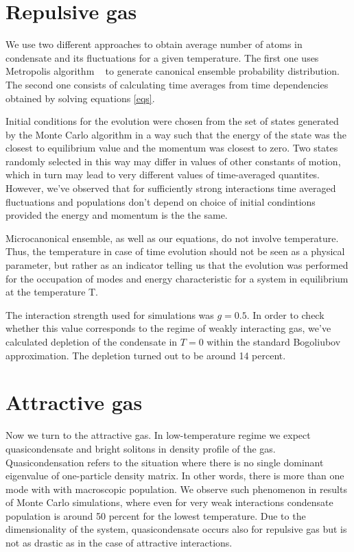\documentclass{article}
\begin{document}
\section{Repulsive gas}
    We use two different approaches to obtain average number of atoms in condensate and its fluctuations for a given temperature. The first one uses Metropolis algorithm ~\cite{metropolis1953equation} to generate canonical ensemble probability distribution. The second one consists of calculating time averages from time dependencies obtained by solving equations \ref{eqs}.
    
     Initial conditions for the evolution were chosen from the set of states generated by the Monte Carlo algorithm in a way such that the energy of the state was the closest to equilibrium value and the momentum was closest to zero. Two states randomly selected in this way may differ in values of other constants of motion, which in turn may lead to very different values of time-averaged quantites. However, we've observed that for sufficiently strong interactions time averaged fluctuations and populations don't depend on choice of initial condintions provided the energy and momentum is the the same.
     
    Microcanonical ensemble, as well as our equations, do not involve temperature.
    Thus, the temperature in case of time evolution should not be seen as a physical parameter, but rather as an indicator telling us that the evolution was performed for the  occupation of modes and energy characteristic for a system in equilibrium at the temperature T.
    
    The interaction strength used for simulations was $g=0.5$. In order to check whether this value corresponds to the regime of weakly interacting gas, we've calculated depletion of the condensate in $T=0$ within the standard Bogoliubov approximation. The depletion turned out to be around 14 percent.

\section{Attractive gas}
   Now we turn to the attractive gas. In low-temperature regime we expect quasicondensate and bright solitons in density profile of the gas. Quasicondensation refers to the situation where there is no single dominant eigenvalue of one-particle density matrix. In other words, there is more than one mode with with macroscopic population. We observe such phenomenon in results of Monte Carlo simulations, where even for very weak interactions condensate population is around 50 percent for the lowest temperature. Due to the dimensionality of the system, quasicondensate occurs also for repulsive gas but is not as drastic as in the case of attractive interactions.
\end{document}
